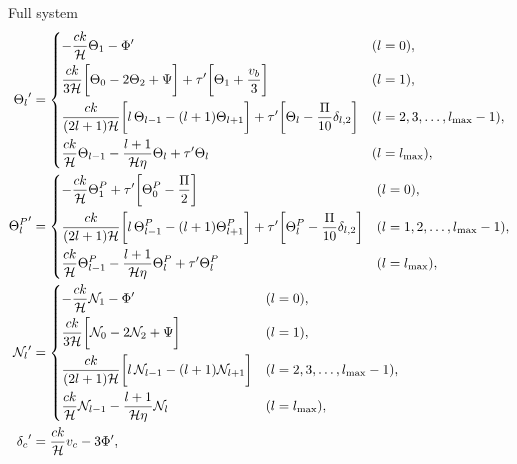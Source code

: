 \documentclass[10pt,a4paper]{article}
\begin{document}
Full system
\begin{subequations}
\begin{align}
	{\Theta_l}^\prime   &= \begin{dcases}
	                       -\frac{ck}{\aH} \Theta_1 - \Phi^\prime & (l=0), \\
	                       \frac{ck}{3\aH} \bigg[ \Theta_0 - 2 \Theta_2 + \Psi \bigg] + \tau^\prime \bigg[ \Theta_1 + \frac{v_b}{3} \bigg] & (l=1), \\
	                       \frac{ck}{(2l+1)\aH} \bigg[ l \, \Theta_{l-1} - (l+1) \Theta_{l+1} \bigg] + \tau^\prime \bigg[ \Theta_l - \frac{\Pi}{10} \delta_{l,2} \bigg] & (l = 2, 3, \ldots, l_\text{max}-1), \\
	                       \frac{ck}{\aH} \Theta_{l-1} - \frac{l+1}{\aH \eta} \Theta_l + \tau^\prime \Theta_l & (l=l_\text{max}), \\
	                       \end{dcases} \\
	{\Theta^P_l}^\prime &= \begin{dcases}
	                       -\frac{ck}{\aH} \Theta^P_1 + \tau^\prime \bigg[ \Theta^P_0 - \frac{\Pi}{2} \bigg] & (l=0), \\
	                       \frac{ck}{(2l+1)\aH} \bigg[ l \, \Theta^P_{l-1} - (l+1) \Theta^P_{l+1} \bigg] + \tau^\prime \bigg[ \Theta^P_l - \frac{\Pi}{10} \delta_{l,2} \bigg] & (l = 1, 2, \ldots, l_\text{max}-1), \\
	                       \frac{ck}{\aH} \Theta^P_{l-1} - \frac{l+1}{\aH \eta} \Theta^P_l + \tau^\prime \Theta^P_l & (l=l_\text{max}), \\
	                       \end{dcases} \\
	{\N_l}^\prime       &= \begin{dcases}
	                       -\frac{ck}{\aH} \N_1 - \Phi^\prime & (l=0), \\
	                       \frac{ck}{3\aH} \bigg[ \N_0 - 2 \N_2 + \Psi \bigg] & (l=1) , \\
	                       \frac{ck}{(2l+1)\aH} \bigg[ l \, \N_{l-1} - (l+1) \N_{l+1} \bigg] & (l=2,3,\ldots,l_\text{max}-1), \\
	                       \frac{ck}{\aH} \N_{l-1} - \frac{l+1}{\aH \eta} \N_l & (l=l_\text{max}), \\
	                       \end{dcases} \\
	{\delta_c}^\prime   &= \frac{ck}{\aH} v_c - 3 \Phi^\prime , \\

\end{align}
\end{subequations}
\end{document}
